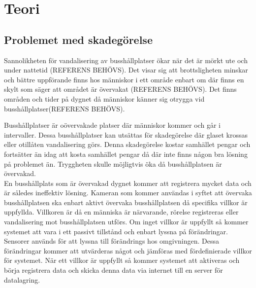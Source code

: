 
\chapter{Teori} %
\label{teori}

\ifpdf
    \graphicspath{{3/figures/PNG/}{3/figures/PDF/}{3/figures/}}
\else
    \graphicspath{{3/figures/EPS/}{3/figures/}}
\fi

\graphicspath{{3/figures/}{3/figures/}}


\section{Problemet med skadegörelse}

Sannolikheten för vandalisering av busshållplatser ökar när det är mörkt ute och under nattetid (REFERENS BEHÖVS). Det visar sig att brottsligheten minskar och bättre uppförande finns hos människor i ett område enbart om där finns en skylt som säger att området är övervakat (REFERENS BEHÖVS). Det finns områden och tider på dygnet då människor känner sig otrygga vid busshållplatser(REFERENS BEHÖVS). 

Busshållplatser är oövervakade platser där människor kommer och går i intervaller. Dessa busshållplatser kan utsättas för skadegörelse där glaset krossas eller otillåten vandalisering görs. Denna skadegörelse kostar samhället pengar och fortsätter än idag att kosta samhället pengar då där inte finns någon bra lösning på problemet än. Tryggheten skulle möjligtvis öka då busshållplatsen är övervakad.\\


En busshållplats som är övervakad dygnet kommer att registrera mycket data och är således ineffektiv lösning. Kameran som kommer användas i syftet att övervaka busshållplatsen ska enbart aktivt övervaka busshållplatsen då specifika villkor är uppfyllda. Villkoren är då en människa är närvarande, rörelse registreras eller vandalisering mot busshållplatsen utförs. Om inget villkor är uppfyllt så kommer systemet att vara i ett passivt tillstånd och enbart lyssna på förändringar.\\

Sensorer används för att lyssna till förändrings hos omgivningen. Dessa förändringar kommer att utvärderas något och jämföras med fördefinierade villkor för systemet. När ett villkor är uppfyllt så kommer systemet att aktiveras och börja registrera data och skicka denna data via internet till en server för datalagring.\\


